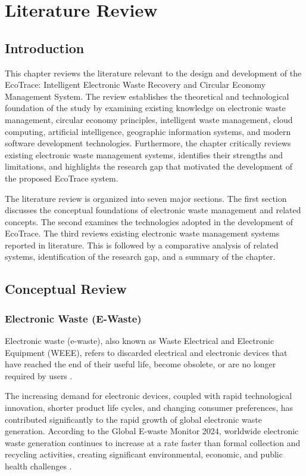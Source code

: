 \chapter{Literature Review}
\label{ch:literature}

\section{Introduction}

This chapter reviews the literature relevant to the design and development of the
EcoTrace: Intelligent Electronic Waste Recovery and Circular Economy Management
System. The review establishes the theoretical and technological foundation of the
study by examining existing knowledge on electronic waste management, circular
economy principles, intelligent waste management, cloud computing, artificial
intelligence, geographic information systems, and modern software development
technologies. Furthermore, the chapter critically reviews existing electronic waste
management systems, identifies their strengths and limitations, and highlights the
research gap that motivated the development of the proposed EcoTrace system.

The literature review is organized into seven major sections. The first section
discusses the conceptual foundations of electronic waste management and related
concepts. The second examines the technologies adopted in the development of
EcoTrace. The third reviews existing electronic waste management systems reported
in literature. This is followed by a comparative analysis of related systems,
identification of the research gap, and a summary of the chapter.

\section{Conceptual Review}

\subsection{Electronic Waste (E-Waste)}

Electronic waste (e-waste), also known as Waste Electrical and Electronic Equipment
(WEEE), refers to discarded electrical and electronic devices that have reached the
end of their useful life, become obsolete, or are no longer required by users
\citep{forti2024}.

The increasing demand for electronic devices, coupled with rapid technological
innovation, shorter product life cycles, and changing consumer preferences, has
contributed significantly to the rapid growth of global electronic waste generation.
According to the Global E-waste Monitor 2024, worldwide electronic waste
generation continues to increase at a rate faster than formal collection and recycling
activities, creating significant environmental, economic, and public health
challenges \citep{forti2024}.

